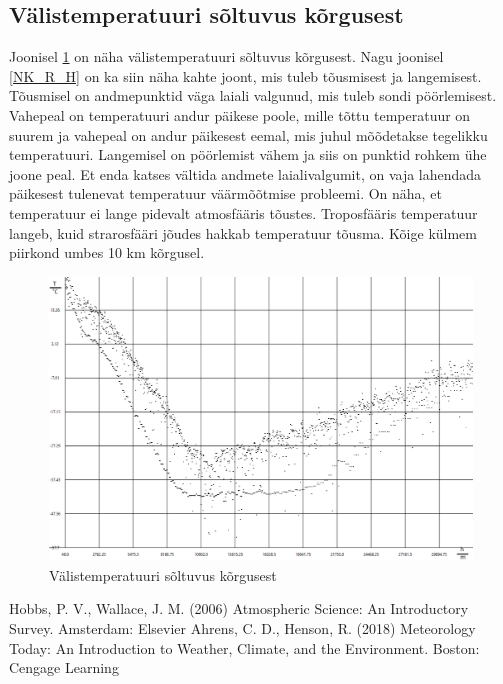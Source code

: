 \documentclass{trkut}%
\begin{document}
\subsection{Välistemperatuuri sõltuvus kõrgusest}
Joonisel \ref{NK_T_H} on näha välistemperatuuri sõltuvus kõrgusest. Nagu  joonisel \ref{NK_R_H} on ka siin näha kahte joont, mis tuleb tõusmisest ja langemisest. Tõusmisel on andmepunktid väga laiali valgunud, mis tuleb sondi pöörlemisest. Vahepeal on temperatuuri andur päikese poole, mille tõttu temperatuur on suurem ja vahepeal on andur päikesest eemal, mis juhul mõõdetakse tegelikku temperatuuri. Langemisel on pöörlemist vähem ja siis on punktid rohkem ühe joone peal. Et enda katses vältida andmete laialivalgumit, on vaja lahendada päikesest tulenevat temperatuur väärmõõtmise probleemi.
\newline On näha, et temperatuur ei lange pidevalt atmosfääris tõustes. Troposfääris temperatuur langeb, kuid strarosfääri jõudes hakkab temperatuur tõusma. Kõige külmem piirkond umbes 10 km kõrgusel.
\begin{figure}[h]
	\includegraphics[width=1\textwidth]{NK_T_H.png}
	\caption{Välistemperatuuri sõltuvus kõrgusest}
	\label{NK_T_H}%
\end{figure}


 

Hobbs, P. V., Wallace, J. M. (2006) Atmospheric Science: An Introductory Survey. Amsterdam: Elsevier \newline
Ahrens, C. D., Henson, R. (2018) Meteorology Today: An Introduction to Weather, Climate, and the Environment. Boston: Cengage Learning




\kinnitusleht%
\end{document}

